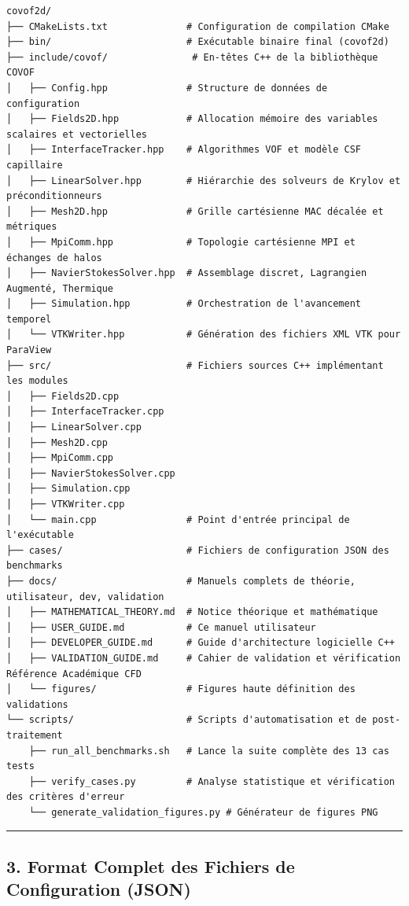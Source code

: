 \documentclass[
  french,
]{article}
\begin{document}
\begin{verbatim}
covof2d/
├── CMakeLists.txt              # Configuration de compilation CMake
├── bin/                        # Exécutable binaire final (covof2d)
├── include/covof/               # En-têtes C++ de la bibliothèque COVOF
│   ├── Config.hpp              # Structure de données de configuration
│   ├── Fields2D.hpp            # Allocation mémoire des variables scalaires et vectorielles
│   ├── InterfaceTracker.hpp    # Algorithmes VOF et modèle CSF capillaire
│   ├── LinearSolver.hpp        # Hiérarchie des solveurs de Krylov et préconditionneurs
│   ├── Mesh2D.hpp              # Grille cartésienne MAC décalée et métriques
│   ├── MpiComm.hpp             # Topologie cartésienne MPI et échanges de halos
│   ├── NavierStokesSolver.hpp  # Assemblage discret, Lagrangien Augmenté, Thermique
│   ├── Simulation.hpp          # Orchestration de l'avancement temporel
│   └── VTKWriter.hpp           # Génération des fichiers XML VTK pour ParaView
├── src/                        # Fichiers sources C++ implémentant les modules
│   ├── Fields2D.cpp
│   ├── InterfaceTracker.cpp
│   ├── LinearSolver.cpp
│   ├── Mesh2D.cpp
│   ├── MpiComm.cpp
│   ├── NavierStokesSolver.cpp
│   ├── Simulation.cpp
│   ├── VTKWriter.cpp
│   └── main.cpp                # Point d'entrée principal de l'exécutable
├── cases/                      # Fichiers de configuration JSON des benchmarks
├── docs/                       # Manuels complets de théorie, utilisateur, dev, validation
│   ├── MATHEMATICAL_THEORY.md  # Notice théorique et mathématique
│   ├── USER_GUIDE.md           # Ce manuel utilisateur
│   ├── DEVELOPER_GUIDE.md      # Guide d'architecture logicielle C++
│   ├── VALIDATION_GUIDE.md     # Cahier de validation et vérification Référence Académique CFD
│   └── figures/                # Figures haute définition des validations
└── scripts/                    # Scripts d'automatisation et de post-traitement
    ├── run_all_benchmarks.sh   # Lance la suite complète des 13 cas tests
    ├── verify_cases.py         # Analyse statistique et vérification des critères d'erreur
    └── generate_validation_figures.py # Générateur de figures PNG
\end{verbatim}

\begin{center}\rule{0.5\linewidth}{0.5pt}\end{center}

\subsection{3. Format Complet des Fichiers de Configuration
(JSON)}\label{format-complet-des-fichiers-de-configuration-json}
\end{document}
